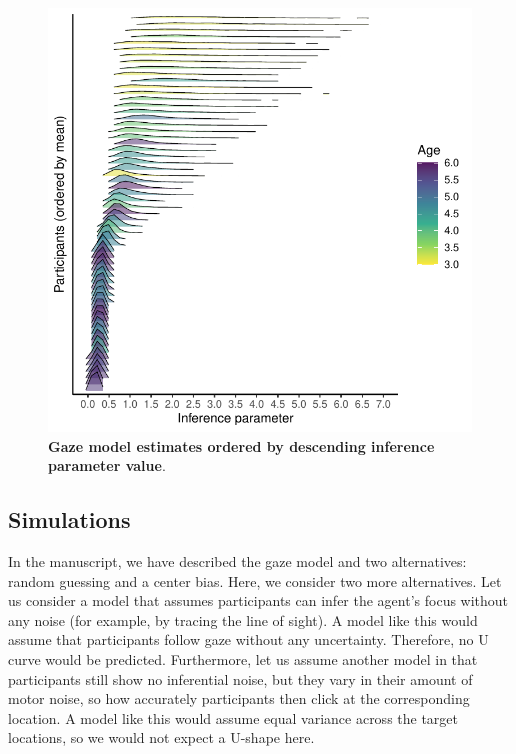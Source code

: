\documentclass[
  man,floatsintext]{apa7}
\begin{document}
\begin{figure}[H]

{\centering \includegraphics[width=1\linewidth]{../figures/supplements_gazemodel_indinference} 

}

\caption{\textbf{Gaze model estimates ordered by descending inference parameter value}.}\label{fig:fig4}
\end{figure}

\newpage

\hypertarget{simulations}{%
\subsection{Simulations}\label{simulations}}

In the manuscript, we have described the gaze model and two alternatives: random guessing and a center bias. Here, we consider two more alternatives. Let us consider a model that assumes participants can infer the agent's focus without any noise (for example, by tracing the line of sight). A model like this would assume that participants follow gaze without any uncertainty. Therefore, no U curve would be predicted.
Furthermore, let us assume another model in that participants still show no inferential noise, but they vary in their amount of motor noise, so how accurately participants then click at the corresponding location. A model like this would assume equal variance across the target locations, so we would not expect a U-shape here.
\end{document}
